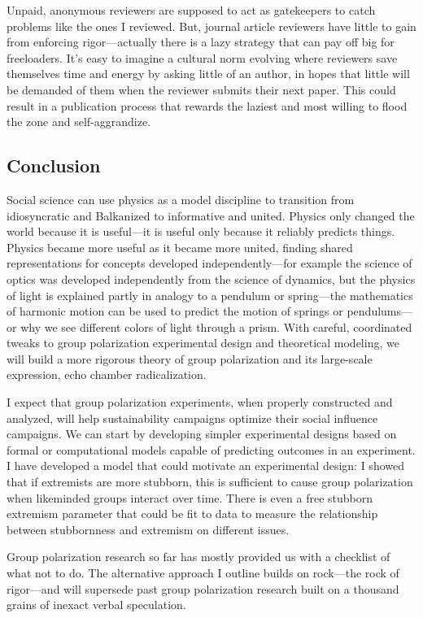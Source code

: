 \documentclass[preview]{article}
\begin{document}
Unpaid, anonymous reviewers are supposed to act as gatekeepers to catch problems like the ones I reviewed. But, journal article reviewers have little to gain from enforcing rigor—actually there is a lazy strategy that can pay off big for freeloaders. It’s easy to imagine a cultural norm evolving where reviewers save themselves time and energy by asking little of an author, in hopes that little will be demanded of them when the reviewer submits their next paper. This could result in a publication process that rewards the laziest and most willing to flood the zone and self-aggrandize.

\subsection{Conclusion}

Social science can use physics as a model discipline to transition from idiosyncratic and Balkanized to informative and united. Physics only changed the world because it is useful—it is useful only because it reliably predicts things. Physics became more useful as it became more united, finding shared representations for concepts developed independently—for example the science of optics was developed independently from the science of dynamics, but the physics of light is explained partly in analogy to a pendulum or spring—the mathematics of harmonic motion can be used to predict the motion of springs or pendulums—or why we see different colors of light through a prism. With careful, coordinated tweaks to group polarization experimental design and theoretical modeling, we will build a more rigorous theory of group polarization and its large-scale expression, echo chamber radicalization.

I expect that group polarization experiments, when properly constructed and analyzed, will help sustainability campaigns optimize their social influence campaigns. We can start by developing simpler experimental designs based on formal or computational models capable of predicting outcomes in an experiment. I have developed a model that could motivate an experimental design: I showed that if extremists are more stubborn, this is sufficient to cause group polarization when likeminded groups interact over time. There is even a free stubborn extremism parameter that could be fit to data to measure the relationship between stubbornness and extremism on different issues.

Group polarization research so far has mostly provided us with a checklist of what not to do. The alternative approach I outline builds on rock—the rock of rigor—and will supersede past group polarization research built on a thousand grains of inexact verbal speculation.
\end{document}
